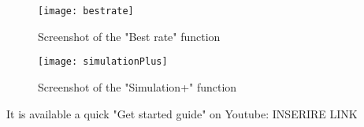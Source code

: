 \documentclass[a4paper,12pt]{article}
\begin{document}
\begin{figure}[H]
	\centering
   	 \texttt{[image: bestrate]}
	\caption{Screenshot of the "Best rate" function}
\end{figure}

\begin{figure}[H]
	\centering
   	 \texttt{[image: simulationPlus]}
	\caption{Screenshot of the "Simulation+" function}
\end{figure}

It is available a quick "Get started guide" on Youtube: INSERIRE LINK

\newpage
\end{document}
